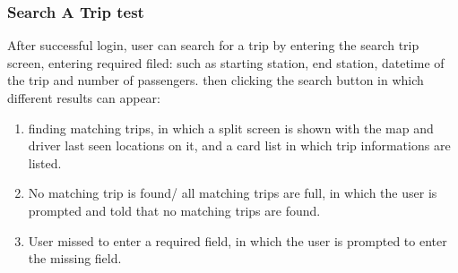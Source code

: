 \documentclass[a4paper, 12pt]{report} %
\begin{document}
            \subsubsection{Search A Trip test}
                After successful login, user can search for a trip by entering the search trip screen, entering required filed: such as starting station, end station, datetime of the trip and number of passengers.
                then clicking the search button in which different results can appear:
                \begin{enumerate}
                    \item finding matching trips, in which a split screen is shown with the map and driver last seen locations on it, and a card list in which trip informations are listed.
                    \item No matching trip is found/ all matching trips are full, in which the user is prompted and told that no matching trips are found.
                    \item User missed to enter a required field, in which the user is prompted to enter the missing field.
                \end{enumerate}

                \pagebreak
\end{document}
